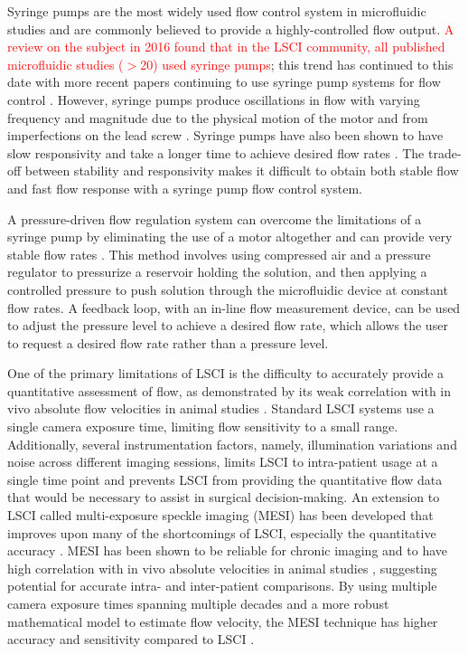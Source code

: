 \documentclass[12pt]{spieman}
\begin{document}
\begin{spacing}{2}
Syringe pumps are the most widely used flow control system in microfluidic studies and are commonly believed to provide a highly-controlled flow output. \textcolor{red}{A review on the subject in 2016 \cite{Richards.2015} found that in the LSCI community, all published microfluidic studies ($>$20) used syringe pumps}; this trend has continued to this date with more recent papers continuing to use syringe pump systems for flow control \cite{Zheng:2018ct,Yang.2019}. However, syringe pumps produce oscillations in flow with varying frequency and magnitude due to the physical motion of the motor and from imperfections on the lead screw \cite{Korczyk:2010eu,Li:2014ca}. Syringe pumps have also been shown to have slow responsivity and take a longer time to achieve desired flow rates \cite{Zhou:2011ey}. The trade-off between stability and responsivity makes it difficult to obtain both stable flow and fast flow response with a syringe pump flow control system.

A pressure-driven flow regulation system can overcome the limitations of a syringe pump by eliminating the use of a motor altogether and can provide very stable flow rates \cite{Korczyk:2010eu,Li:2014ca,Zhou:2011ey}. This method involves using compressed air and a pressure regulator to pressurize a reservoir holding the solution, and then applying a controlled pressure to push solution through the microfluidic device at constant flow rates. A feedback loop, with an in-line flow measurement device, can be used to adjust the pressure level to achieve a desired flow rate, which allows the user to request a desired flow rate rather than a pressure level.

One of the primary limitations of LSCI is the difficulty to accurately provide a quantitative assessment of flow, as demonstrated by its weak correlation with in vivo absolute flow velocities in animal studies \cite{Kazmi:2013hp}. Standard LSCI systems use a single camera exposure time, limiting flow sensitivity to a small range. Additionally, several instrumentation factors, namely, illumination variations and noise across different imaging sessions, limits LSCI to intra-patient usage at a single time point and prevents LSCI from providing the quantitative flow data that would be necessary to assist in surgical decision-making. An extension to LSCI called multi-exposure speckle imaging (MESI) has been developed that improves upon many of the shortcomings of LSCI, especially the quantitative accuracy \cite{Parthasarathy:2008el}. MESI has been shown to be reliable for chronic imaging and to have high correlation with in vivo absolute velocities in animal studies \cite{Kazmi:2013hp}, suggesting potential for accurate intra- and inter-patient comparisons. By using multiple camera exposure times spanning multiple decades and a more robust mathematical model to estimate flow velocity, the MESI technique has higher accuracy and sensitivity compared to LSCI \cite{Parthasarathy:2008el}.


\end{spacing}
\end{document}

